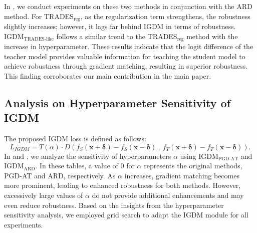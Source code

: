 \documentclass{article} %
\begin{document}
In , we conduct experiments on these two methods in conjunction with the ARD \citep{ard} method.
For TRADES$_\text{reg}$, as the regularization term strengthens, the robustness slightly increases; however, it lags far behind IGDM in terms of robustness. 
IGDM$_\text{TRADES-like}$ follows a similar trend to the TRADES$_\text{reg}$ method with the increase in hyperparameter.
These results indicate that the logit difference of the teacher model provides valuable information for teaching the student model to achieve robustness through gradient matching, resulting in superior robustness. This finding corroborates our main contribution in the main paper.






\subsection{Analysis on Hyperparameter Sensitivity of IGDM}
\label{sec:hyperparameter}
The proposed IGDM loss is defined as follows:
\begin{equation*}
L_{IGDM} = T(\alpha) \cdot D\left (f_S(\textbf{x} + \boldsymbol{\delta} ) - f_S(\textbf{x} - \boldsymbol{\delta} )\ , \ f_T(\textbf{x} + \boldsymbol{\delta}) - f_T(\textbf{x} - \boldsymbol{\delta} ) \right ).
\end{equation*}
In  and , we analyze the sensitivity of hyperparameters $\alpha$ using IGDM$_\text{PGD-AT}$ and IGDM$_\text{ARD}$.
In these tables, a value of 0 for $\alpha$ represents the original methods, PGD-AT and ARD, respectively.
As $\alpha$ increases, gradient matching becomes more prominent, leading to enhanced robustness for both methods.
However, excessively large values of $\alpha$ do not provide additional enhancements and may even reduce robustness.
Based on the insights from the hyperparameter sensitivity analysis, we employed grid search to adapt the IGDM module for all experiments.
\end{document}
